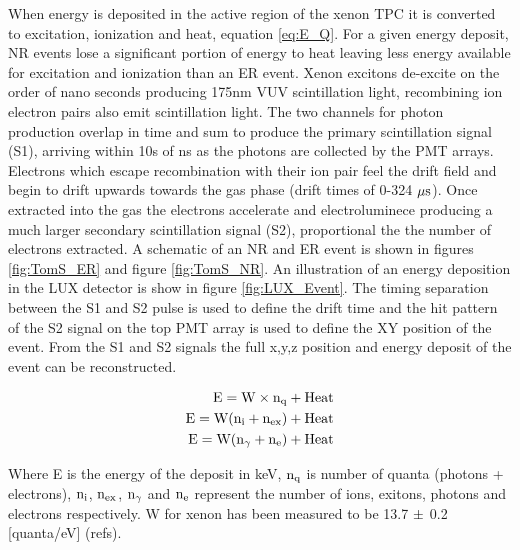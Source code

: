 When energy is deposited in the active region of the xenon TPC it is converted to excitation, ionization and heat, equation \ref{eq:E_Q}. For a given energy deposit, NR events lose a significant portion of energy to heat leaving less energy available for excitation and ionization than an ER event. Xenon excitons de-excite on the order of nano seconds producing 175nm VUV scintillation light, recombining ion electron pairs also emit scintillation light. The two channels for photon production overlap in time and sum to produce the primary scintillation signal (S1), arriving within 10s of ns as the photons are collected by the  PMT arrays. Electrons which escape recombination with their ion pair feel the drift field and begin to drift upwards towards the gas phase (drift times of 0-324 $\rm \mu s$). Once extracted into the gas the electrons accelerate and electroluminece  producing a much larger secondary scintillation signal (S2), proportional the the number of electrons extracted. A schematic of an NR and ER event is shown in figures \ref{fig:TomS_ER} and figure \ref{fig:TomS_NR}. An illustration of an energy deposition in the LUX detector is show in figure \ref{fig:LUX_Event}. The timing separation between the S1 and S2 pulse is used to define the drift time and the hit pattern of the S2 signal on the top PMT array is used to define the XY position of the event. From the S1 and S2 signals the full x,y,z position and energy deposit of the event can be reconstructed.



\begin{equation}
\begin{split}
\rm E= W\times n_q + Heat \\
\rm E= W (n_i + n_{ex}) + Heat \\
\rm E= W (n_\gamma + n_e) + Heat \\
\label{eq:E_Q}
\end{split}
\end{equation}

Where E is the energy of the deposit in keV, $\rm n_q$ is number of quanta (photons + electrons), $\rm n_i$, $\rm n_{ex}$, $\rm n_\gamma$ and $\rm n_e$ represent the number of ions, exitons, photons and electrons respectively. W for xenon has been measured to be 13.7 $\rm \pm$ 0.2  [quanta/eV] (refs).


\renewcommand{\baselinestretch}{1}
\small\normalsize

